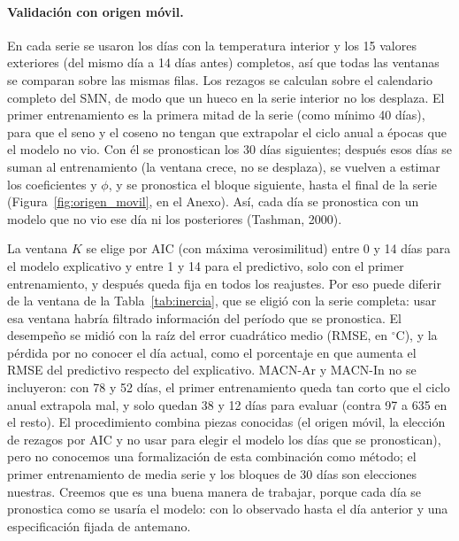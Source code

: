 \documentclass[11pt,a4paper]{article}
\begin{document}
\paragraph{Validación con origen móvil.} En cada serie se usaron los días con la temperatura interior y los 15 valores exteriores (del mismo día a 14 días antes) completos, así que todas las ventanas se comparan sobre las mismas filas. Los rezagos se calculan sobre el calendario completo del SMN, de modo que un hueco en la serie interior no los desplaza. El primer entrenamiento es la primera mitad de la serie (como mínimo 40 días), para que el seno y el coseno no tengan que extrapolar el ciclo anual a épocas que el modelo no vio. Con él se pronostican los 30 días siguientes; después esos días se suman al entrenamiento (la ventana crece, no se desplaza), se vuelven a estimar los coeficientes y $\phi$, y se pronostica el bloque siguiente, hasta el final de la serie (Figura~\ref{fig:origen_movil}, en el Anexo). Así, cada día se pronostica con un modelo que no vio ese día ni los posteriores (Tashman, 2000).

La ventana $K$ se elige por AIC (con máxima verosimilitud) entre 0 y 14 días para el modelo explicativo y entre 1 y 14 para el predictivo, solo con el primer entrenamiento, y después queda fija en todos los reajustes. Por eso puede diferir de la ventana de la Tabla~\ref{tab:inercia}, que se eligió con la serie completa: usar esa ventana habría filtrado información del período que se pronostica. El desempeño se midió con la raíz del error cuadrático medio (RMSE, en $^\circ$C), y la pérdida por no conocer el día actual, como el porcentaje en que aumenta el RMSE del predictivo respecto del explicativo. MACN-Ar y MACN-In no se incluyeron: con 78 y 52 días, el primer entrenamiento queda tan corto que el ciclo anual extrapola mal, y solo quedan 38 y 12 días para evaluar (contra 97 a 635 en el resto). El procedimiento combina piezas conocidas (el origen móvil, la elección de rezagos por AIC y no usar para elegir el modelo los días que se pronostican), pero no conocemos una formalización de esta combinación como método; el primer entrenamiento de media serie y los bloques de 30 días son elecciones nuestras. Creemos que es una buena manera de trabajar, porque cada día se pronostica como se usaría el modelo: con lo observado hasta el día anterior y una especificación fijada de antemano.
\end{document}
